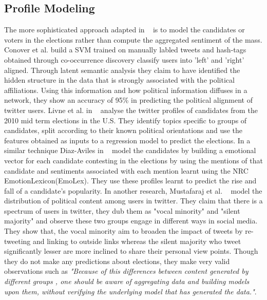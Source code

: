 \subsection{Profile Modeling}
The more sophisticated approach adapted in ~\cite{livne2011party,conover2011predicting,diaz2012taking} is to model the candidates or voters in the elections rather than compute the aggregated sentiment of the mass.  Conover et al. build a SVM trained on manually labled tweets and hash-tags obtained through co-occurrence discovery classify users into 'left' and 'right' aligned. Through latent semantic analysis they claim to have identified the hidden structure in the data that is strongly associated with the political affiliations. Using this information and how political information diffuses in a network, they show  an accuracy of 95\%  in predicting the political alignment of twitter users. Livne et al. in ~\cite{livne2011party} analyse the twitter profiles of candidates from the 2010 mid term elections in the U.S. They identify topics specific to groups of candidates, split according to their known political orientations and use the features obtained as inputs to a regression model to predict the elections. In a similar technique Diaz-Aviles in ~\cite{diaz2012taking} model the candidates by building a emotional vector for each candidate contesting in the elections by using the mentions of that candidate and sentiments associated with each mention learnt using the NRC EmotionLexicon(EmoLex). They use these profiles learnt to predict the rise and fall of a candidate's popularity. In another research, Mustafaraj et al. ~\cite{mustafaraj2011vocal} model the distribution of political content among users in twitter. They claim that there is a spectrum of users in twitter, they dub them as "vocal minority" and "silent majority" and observe these two groups engage in different ways in social media. They show that, the vocal minority aim to broaden the impact of tweets by re-tweeting and linking to outside links whereas the silent majority who tweet significantly lesser are more inclined to share their personal view points. Though they do not make any predictions about elections, they make very valid observations such as \emph{"Because of this differences between content generated by different groups , one should be aware of aggregating data and building models upon them, without verifying the underlying model that has generated the data."}.
